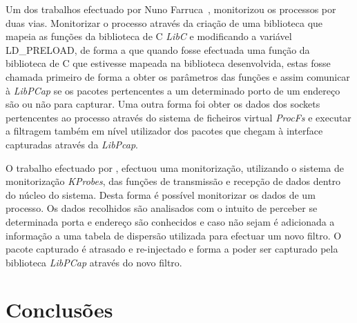 \documentclass[runningheads,a4paper]{llncs}
\begin{document}
Um dos trabalhos efectuado por Nuno Farruca~\cite{Farruca:2009}, monitorizou os processos por duas vias. Monitorizar o processo através da criação de uma biblioteca que mapeia as funções da biblioteca de C \textit{LibC} e modificando a variável LD\_PRELOAD, de forma a que quando fosse efectuada uma função da biblioteca de C que estivesse mapeada na biblioteca desenvolvida, estas fosse chamada primeiro de forma a obter os parâmetros das funções e assim comunicar à \textit{LibPCap} se os pacotes pertencentes a um determinado porto de um endereço são ou não para capturar. Uma outra forma foi obter os dados dos sockets pertencentes ao processo através do sistema de ficheiros virtual \textit{ProcFs} e executar a filtragem também em nível utilizador dos pacotes que chegam à interface capturadas através da \textit{LibPcap}.

O trabalho efectuado por \cite{1688981}, efectuou uma monitorização, utilizando o sistema de monitorização \textit{KProbes}, das funções de transmissão e recepção de dados dentro do núcleo do sistema. Desta forma é possível monitorizar os dados de um processo. Os dados recolhidos são analisados com o intuito de perceber se determinada porta e endereço são conhecidos e caso não sejam é adicionada a informação a uma tabela de dispersão utilizada para efectuar um novo filtro. O pacote capturado  é atrasado e re-injectado e forma a poder ser capturado pela biblioteca \textit{LibPCap} através do novo filtro.

\section{Conclusões}
\label{sec:conclusions}




\end{document}
